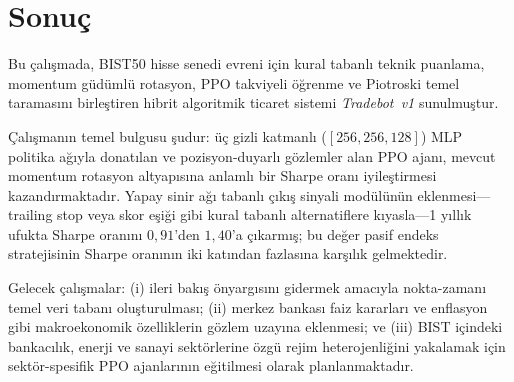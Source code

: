 \documentclass[journal]{IEEEtran}
\begin{document}
\section{Sonuç}

Bu çalışmada, BIST50 hisse senedi evreni için kural tabanlı teknik
puanlama, momentum güdümlü rotasyon, PPO takviyeli öğrenme ve
Piotroski temel taramasını birleştiren hibrit algoritmik ticaret
sistemi \textit{Tradebot~v1} sunulmuştur.

Çalışmanın temel bulgusu şudur: üç gizli katmanlı ($[256, 256, 128]$)
MLP politika ağıyla donatılan ve pozisyon-duyarlı gözlemler alan PPO
ajanı, mevcut momentum rotasyon altyapısına anlamlı bir Sharpe oranı
iyileştirmesi kazandırmaktadır. Yapay sinir ağı tabanlı çıkış sinyali
modülünün eklenmesi—trailing stop veya skor eşiği gibi kural tabanlı
alternatiflere kıyasla—1 yıllık ufukta Sharpe oranını $0{,}91$'den
$1{,}40$'a çıkarmış; bu değer pasif endeks stratejisinin Sharpe
oranının iki katından fazlasına karşılık gelmektedir.

Gelecek çalışmalar: (i) ileri bakış önyargısını gidermek amacıyla
nokta-zamanı temel veri tabanı oluşturulması; (ii) merkez bankası
faiz kararları ve enflasyon gibi makroekonomik özelliklerin gözlem
uzayına eklenmesi; ve (iii) BIST içindeki bankacılık, enerji ve
sanayi sektörlerine özgü rejim heterojenliğini yakalamak için
sektör-spesifik PPO ajanlarının eğitilmesi olarak planlanmaktadır.
\end{document}
